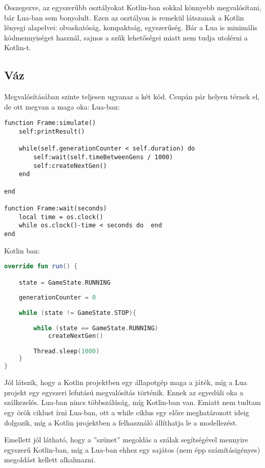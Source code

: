 Összegezve, az egyszerűbb osztályokat Kotlin-ban sokkal könnyebb megvalósítani, bár Lua-ban sem bonyolult. Ezen az osztályon is remekül látszanak a Kotlin lényegi alapelvei: olvashatóság, kompaktság, egyszerűség. Bár a Lua is minimális kódmennyiséget használ, sajnos a szűk lehetőségei miatt nem tudja utolérni a Kotlin-t.

\subsection{Váz}

Megvalósításában szinte teljesen ugyanaz a két kód. Csupán pár helyen térnek el, de ott megvan a maga oka:
Lua-ban:
\scriptsize
\begin{lstlisting}[style=Lua]
function Frame:simulate()
	self:printResult()
	
	while(self.generationCounter < self.duration) do
		self:wait(self.timeBetweenGens / 1000)
		self:createNextGen()
	end

end

function Frame:wait(seconds)
	local time = os.clock()
	while os.clock()-time < seconds do  end
end
\end{lstlisting}
\normalsize
Kotlin ban:
\scriptsize
\begin{lstlisting}[language = Kotlin]
override fun run() {

	state = GameState.RUNNING
	
	generationCounter = 0
	
	while (state != GameState.STOP){
	
		while (state == GameState.RUNNING)
			createNextGen()
		
		Thread.sleep(1000)
	}
}
\end{lstlisting}
\normalsize
Jól látszik, hogy a Kotlin projektben egy állapotgép maga a játék, míg a Lua projekt egy egyszeri lefutású megvalósítás történik. Ennek az egyedüli oka a szálkezelés. Lua-ban nincs többszálúság, míg Kotlin-ban van. Emiatt nem tudtam egy örök ciklust írni Lua-ban, ott a while ciklus egy előre meghatározott ideig dolgozik, míg a Kotlin projektben a felhasználó állíthatja le a modellezést.

Emellett jól látható, hogy a ''szünet'' megoldás a szálak segítségével mennyire egyszerű Kotlin-ban, míg a Lua-ban ehhez egy sajátos (nem épp számításigényes) megoldást kellett alkalmazni. 

